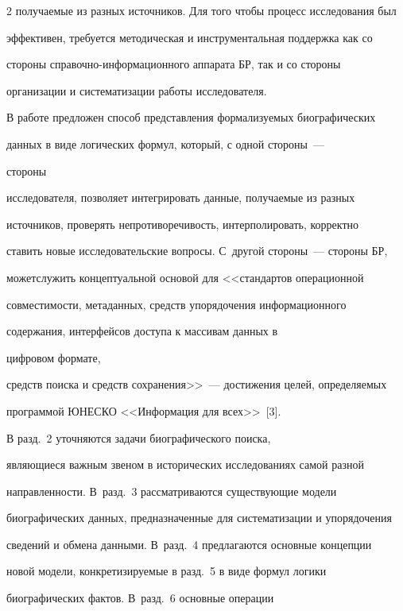 \begin{multicols}{2}
получаемые из разных источников. Для того чтобы процесс исследования был 


эффективен, требуется методическая и инструментальная поддержка как со 


стороны спра\-воч\-но-ин\-фор\-ма\-ци\-он\-но\-го аппарата БР, так и со стороны 


организации и систематизации работы исследователя. 


  


  В работе предложен способ представления формализуемых биографических 


данных в виде логических формул, который, с одной стороны~---\linebreak


стороны 


исследователя, позволяет интегрировать данные, получаемые из разных 


источников, проверять непротиворечивость, интерполировать, корректно 


ставить новые исследовательские вопросы. С~другой стороны~--- стороны БР, 


может\linebreak служить концептуальной основой для <<стандартов операционной 


совместимости, метаданных, средств упорядочения информационного 


содержания, интерфейсов доступа к массивам данных в\linebreak


 цифровом формате, 


средств поиска и средств сохранения>>~--- достижения целей, определяемых 


программой ЮНЕСКО <<Информация для всех>>~[3].


  


  В разд.~2 уточняются задачи биографического поиска, 


являющиеся важным звеном в исторических исследованиях самой разной 


направленности. В~разд.~3 рассматриваются существующие модели 


биографических данных, предназначенные для систематизации и упорядочения 


сведений и обмена данными. В~разд.~4 предлагаются основные концепции 


новой модели, конкретизируемые в разд.~5 в виде формул логики 


биографических фактов. В~разд.~6 основные операции 



\end{multicols}
